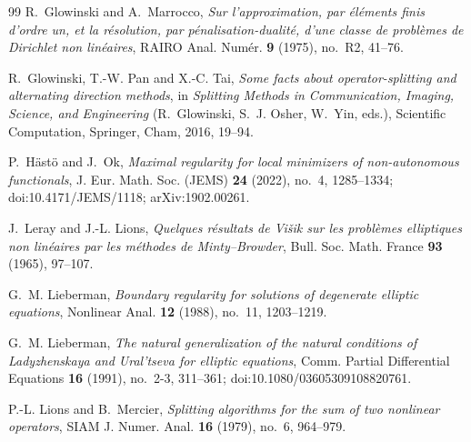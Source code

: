 \documentclass[11pt]{amsart}
\theoremstyle{definition}
\theoremstyle{remark}
\numberwithin{equation}{section}
\begin{document}
\begin{thebibliography}{99}
R.~Glowinski and A.~Marrocco, \emph{Sur l'approximation, par \'el\'ements finis d'ordre un, et la r\'esolution, par p\'enalisation-dualit\'e, d'une classe de probl\`emes de Dirichlet non lin\'eaires}, RAIRO Anal. Num\'er. \textbf{9} (1975), no.~R2, 41--76.

R.~Glowinski, T.-W. Pan and X.-C. Tai, \emph{Some facts about operator-splitting and alternating direction methods}, in \emph{Splitting Methods in Communication, Imaging, Science, and Engineering} (R.~Glowinski, S.~J. Osher, W.~Yin, eds.), Scientific Computation, Springer, Cham, 2016, 19--94.

P.~H\"ast\"o and J.~Ok, \emph{Maximal regularity for local minimizers of non-autonomous functionals}, J. Eur. Math. Soc. (JEMS) \textbf{24} (2022), no.~4, 1285--1334; doi:10.4171/JEMS/1118; arXiv:1902.00261.

J.~Leray and J.-L. Lions, \emph{Quelques r\'esultats de Vi\v{s}ik sur les probl\`emes elliptiques non lin\'eaires par les m\'ethodes de Minty--Browder}, Bull. Soc. Math. France \textbf{93} (1965), 97--107.

G.~M. Lieberman, \emph{Boundary regularity for solutions of degenerate elliptic equations}, Nonlinear Anal. \textbf{12} (1988), no.~11, 1203--1219.

G.~M. Lieberman, \emph{The natural generalization of the natural conditions of Ladyzhenskaya and Ural'tseva for elliptic equations}, Comm. Partial Differential Equations \textbf{16} (1991), no.~2-3, 311--361; doi:10.1080/03605309108820761.

P.-L. Lions and B.~Mercier, \emph{Splitting algorithms for the sum of two nonlinear operators}, SIAM J. Numer. Anal. \textbf{16} (1979), no.~6, 964--979.


\end{thebibliography}
\end{document}
